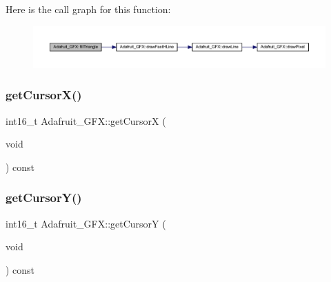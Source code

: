 Here is the call graph for this function\+:\nopagebreak
\begin{figure}[H]
\begin{center}
\leavevmode
\includegraphics[width=350pt]{class_adafruit___g_f_x_a4cd646a3d9c9d5b3ee50010d0aa387cd_cgraph}
\end{center}
\end{figure}
\mbox{\label{class_adafruit___g_f_x_a0d1d15f5f15cad95b4c20f0e9ac9c74b}} 
\subsubsection{\texorpdfstring{get\+Cursor\+X()}{getCursorX()}}
{\footnotesize\ttfamily int16\+\_\+t Adafruit\+\_\+\+G\+F\+X\+::get\+CursorX (\begin{DoxyParamCaption}\item[{void}]{ }\end{DoxyParamCaption}) const}

\mbox{\label{class_adafruit___g_f_x_a81c8558cfcb717c4cfbd5475998daed1}} 
\subsubsection{\texorpdfstring{get\+Cursor\+Y()}{getCursorY()}}
{\footnotesize\ttfamily int16\+\_\+t Adafruit\+\_\+\+G\+F\+X\+::get\+CursorY (\begin{DoxyParamCaption}\item[{void}]{ }\end{DoxyParamCaption}) const}

\mbox{\label{class_adafruit___g_f_x_ab90e1378511b93189a7b557d7dda5d73}} 
